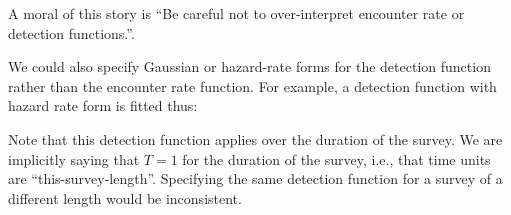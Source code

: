 A moral of this story is ``Be careful not to over-interpret encounter rate or detection functions.''.

We could also specify Gaussian or hazard-rate forms for the detection function rather than the encounter rate function. For example, a detection function with hazard rate form is fitted thus:
{\small
\begin{knitrout}
\color{fgcolor}\begin{kframe}
\begin{alltt}
 \hlkwb{<-}  
                      \hlstd{=}\hlopt{~}\hlopt{~}\hlstd{),} \hlstd{=}\hlstd{)}
\end{alltt}
\end{kframe}
\end{knitrout}
}
Note that this detection function applies over the duration of the survey. We are implicitly saying that $T=1$ for the duration of the survey, i.e., that time units are ``this-survey-length''. Specifying the same detection function for a survey of a different length would be inconsistent.

